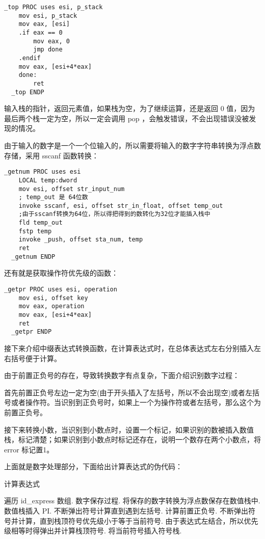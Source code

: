 \documentclass[proposal-report]{bitart}
\begin{document}
\begin{lstlisting}[language={[x86masm]Assembler}]
  _top PROC uses esi, p_stack
    mov esi, p_stack
    mov eax, [esi]
    .if eax == 0
        mov eax, 0
        jmp done
    .endif
    mov eax, [esi+4*eax]
    done:
        ret
  _top ENDP
\end{lstlisting}

输入栈的指针，返回元素值，如果栈为空，为了继续运算，还是返回 0 值，因为最后两个栈一定为空，所以一定会调用 pop ，会触发错误，不会出现错误没被发现的情况。

由于输入的数字是一个一个位输入的，所以需要将输入的数字字符串转换为浮点数存储，采用 sscanf 函数转换：

\begin{lstlisting}[language={[x86masm]Assembler}]
  _getnum PROC uses esi
    LOCAL temp:dword
    mov esi, offset str_input_num
    ; temp_out 是 64位数
    invoke sscanf, esi, offset str_in_float, offset temp_out
    ;由于sscanf转换为64位，所以得把得到的数转化为32位才能插入栈中
    fld temp_out
    fstp temp 
    invoke _push, offset sta_num, temp
    ret
  _getnum ENDP
\end{lstlisting}

还有就是获取操作符优先级的函数：

\begin{lstlisting}[language={[x86masm]Assembler}]
  _getpr PROC uses esi, operation
    mov esi, offset key
    mov eax, operation
    mov eax, [esi+4*eax]
    ret
  _getpr ENDP
\end{lstlisting}

接下来介绍中缀表达式转换函数，在计算表达式时，在总体表达式左右分别插入左右括号便于计算。

由于前置正负号的存在，导致转换数字有点复杂，下面介绍识别数字过程：

首先前置正负号左边一定为空(由于开头插入了左括号，所以不会出现空)或者左括号或者操作符。当识别到正负号时，如果上一个为操作符或者左括号，那么这个为前置正负号。

接下来转换小数，当识别到小数点时，设置一个标记，如果识别的数被插入数值栈，标记清楚；如果识别到小数点时标记还存在，说明一个数存在两个小数点，将 error 标记置1。

上面就是数字处理部分，下面给出计算表达式的伪代码：

\makeatletter
\def\BState{\State\hskip-\ALG@thistlm}
\makeatother
\begin{algorithm}[htb]
  \caption{计算表达式}
  \begin{algorithmic}
    \State 遍历 id\_express 数组.
    \State 数字保存过程.
    \State 将保存的数字转换为浮点数保存在数值栈中.
    \State 数值栈插入 PI.
    \State 不断弹出符号计算直到遇到左括号.
    \State 计算前置正负号.
    \State 不断弹出符号并计算，直到栈顶符号优先级小于等于当前符号.
    \State 由于表达式左结合，所以优先级相等时得弹出并计算栈顶符号.
    \State 将当前符号插入符号栈.
    \EndIf
    \EndIf
    \EndProcedure
  \end{algorithmic}
\end{algorithm}
\end{document}
